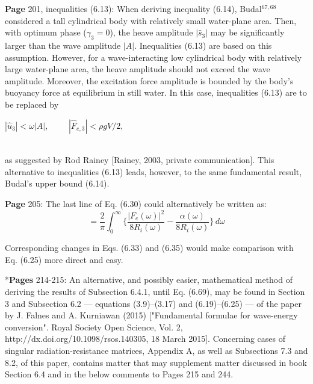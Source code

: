 \documentclass[a4paper,12pt]{article}
\begin{document}
\noindent %
{\bf Page} 201, inequalities (6.13):  \newline \noindent %
When deriving inequality (6.14), Budal$^{67,68}$ considered a tall cylindrical body with relatively small water-plane area. Then, with optimum phase ($\gamma_3 = 0$), the heave amplitude $|\hat s_3|$ may be significantly larger than the wave amplitude $|A|$. Inequalities (6.13) are based on this assumption. However, for a wave-interacting low cylindrical body with relatively large water-plane area, the heave amplitude should not exceed the wave amplitude. Moreover, the excitation force amplitude is bounded by the body's buoyancy force at equilibrium in still water. In this case, inequalities (6.13) are to be replaced by 
\\
\centerline{$|\hat u_3| < \omega |A|, \,\,\,\,\,\,\,\,\,\,\,\,\,\, |\hat F_{e,3}| < \rho g V/2,$}
\\
as suggested by Rod Rainey [Rainey, 2003, private communication]. This alternative to inequalities (6.13) leads, however, to the same fundamental result, Budal's upper bound (6.14). %
\vspace{0.4cm}

\noindent %
{\bf Page} 205: The last line of Eq. (6.30) could alternatively be written as: 
\vspace{-0.2cm}
      \begin{equation*} 
          = \frac{2}{\pi}\int_{0}^{\infty}\Big \{\frac{|F_e(\omega)|^2}{8R_i(\omega)}-
          \frac{\alpha(\omega)}{8R_i(\omega)}\Big \}\, d\omega
      \end{equation*} 
\vspace{-0.2cm}

\noindent
Corresponding changes in Eqs. (6.33) and (6.35) would make comparison 
with Eq. (6.25) more direct and easy. %
\vspace{0.4cm}

\noindent %
*{\bf Pages} 214-215: An alternative, and possibly easier, mathematical method of deriving the results of Subsection 6.4.1, until Eq. (6.69), may be found in Section 3 and Subsection 6.2 --- equations (3.9)--(3.17) and (6.19)--(6.25) --- of the paper by J. Falnes and A. Kurniawan (2015) ["Fundamental formulae for wave-energy conversion". Royal Society Open Science, Vol. 2, http://dx.doi.org/10.1098/rsos.140305, 18 March 2015]. Concerning cases of singular radiation-resistance matrices, Appendix A, as well as Subsections 7.3 and 8.2, of this paper, contains matter that may supplement matter discussed in book Section 6.4 and in the below comments to Pages 215 and 244.
\newline  {$\diamondsuit$}  \vspace{0.25cm} %
\end{document}
